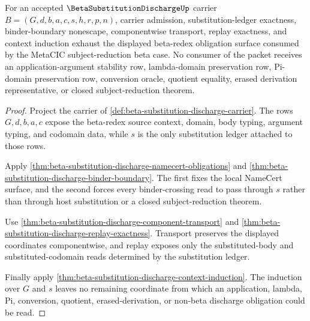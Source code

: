 \begin{theorem}
\label{thm:beta-substitution-discharge-obligation-surface}
For an accepted $\BetaSubstitutionDischargeUp$ carrier $B=(G,d,b,a,c,s,h,r,p,n)$, carrier admission, substitution-ledger exactness, binder-boundary nonescape, componentwise transport, replay exactness, and context induction exhaust the displayed beta-redex obligation surface consumed by the MetaCIC subject-reduction beta case. No consumer of the packet receives an application-argument stability row, lambda-domain preservation row, Pi-domain preservation row, conversion oracle, quotient equality, erased derivation representative, or closed subject-reduction theorem.
\end{theorem}
\begin{proof}
Project the carrier of \autoref{def:beta-substitution-discharge-carrier}. The rows $G,d,b,a,c$ expose the beta-redex source context, domain, body typing, argument typing, and codomain data, while $s$ is the only substitution ledger attached to those rows.

Apply \autoref{thm:beta-substitution-discharge-namecert-obligations} and \autoref{thm:beta-substitution-discharge-binder-boundary}. The first fixes the local NameCert surface, and the second forces every binder-crossing read to pass through $s$ rather than through host substitution or a closed subject-reduction theorem.

Use \autoref{thm:beta-substitution-discharge-component-transport} and \autoref{thm:beta-substitution-discharge-replay-exactness}. Transport preserves the displayed coordinates componentwise, and replay exposes only the substituted-body and substituted-codomain reads determined by the substitution ledger.

Finally apply \autoref{thm:beta-substitution-discharge-context-induction}. The induction over $G$ and $s$ leaves no remaining coordinate from which an application, lambda, Pi, conversion, quotient, erased-derivation, or non-beta discharge obligation could be read.
\end{proof}


